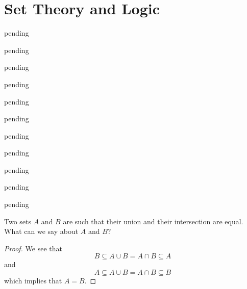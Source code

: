 \section{Set Theory and Logic}

\begin{exercise} \label{0.1}
	pending
\end{exercise}

\begin{exercise} \label{0.2}
	pending
\end{exercise}

\begin{exercise} \label{0.3}
	pending
\end{exercise}

\begin{exercise} \label{0.4}
	pending
\end{exercise}

\begin{exercise} \label{0.5}
	pending
\end{exercise}

\begin{exercise} \label{0.6}
	pending
\end{exercise}

\begin{exercise} \label{0.7}
	pending
\end{exercise}

\begin{exercise} \label{0.8}
	pending
\end{exercise}

\begin{exercise} \label{0.9}
	pending
\end{exercise}

\begin{exercise} \label{0.10}
	pending
\end{exercise}

\begin{exercise} \label{0.11}
	pending
\end{exercise}

\begin{exercise} \label{0.12}
	Two sets $A$ and $B$ are such that their union and their intersection are equal. What can we say about $A$ and $B$?
	
	\begin{proof}
	    We see that
	    $$ B \subseteq A \cup B = A \cap B \subseteq A $$
	    and
	    $$ A \subseteq A \cup B = A \cap B \subseteq B $$
	    which implies that $A=B$.
	\end{proof}
\end{exercise}


